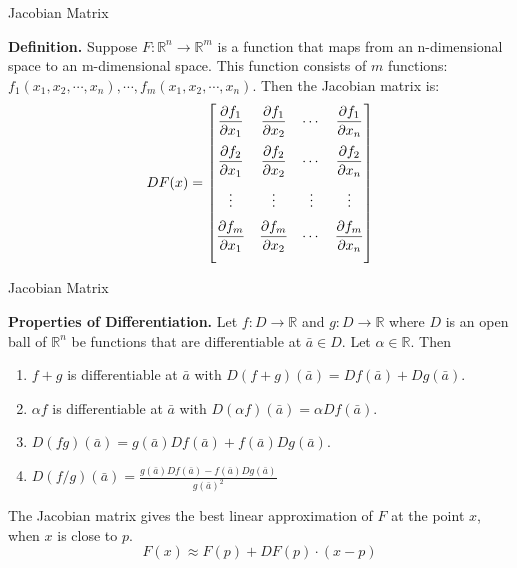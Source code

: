 \documentclass{beamer}
\begin{document}
    \begin{frame}[t]{Jacobian Matrix}
        \begin{block}
            \par \textbf{Definition.} Suppose $F:\mathbb{R}^n\rightarrow\mathbb{R}^m$ is a function that maps from an n-dimensional space to an m-dimensional space. This function consists of $m$ functions: $f_1(x_1,x_2,\cdots, x_n),\cdots,f_m(x_1,x_2,\cdots, x_n)$. Then the Jacobian matrix is:
        \begin{equation*}
DF(x) = 
	\begin{bmatrix}
		\vspace{1.5ex}
		\dfrac{\partial f_1}{\partial x_1} & \dfrac{\partial f_1}{\partial x_2}  & \cdots & \dfrac{\partial f_1}{\partial x_n}\\ 
		\vspace{1.5ex}
		\dfrac{\partial f_2}{\partial x_1} & \dfrac{\partial f_2}{\partial x_2}  & \cdots & \dfrac{\partial f_2}{\partial x_n}\\
		\vspace{1.5ex}
		\vdots                             & \vdots                              & \vdots & \vdots                            \\
		\vspace{1.5ex}
		\dfrac{\partial f_m}{\partial x_1} & \dfrac{\partial f_m}{\partial x_2}  & \cdots & \dfrac{\partial f_m}{\partial x_n}
	\end{bmatrix}
\end{equation*}

        \end{block}

    \end{frame}

    \begin{frame}{Jacobian Matrix}
        \begin{block}
            \par \textbf{Properties of Differentiation.} Let $f: D \to \mathbb{R}$ and $g: D \to \mathbb{R}$ where $D$ is an open ball of $\mathbb{R}^n$ be functions that are differentiable at $\bar{a} \in D$. Let $\alpha \in \mathbb{R}$. Then 
            \begin{enumerate}
                \item $f + g$ is differentiable at $\bar{a}$ with $D(f+g) (\bar{a}) = Df(\bar{a}) + Dg (\bar{a})$.
                \item $\alpha f$ is differentiable at $\bar{a}$ with $D(\alpha f) (\bar{a}) = \alpha D f(\bar{a})$.
                \item $D(fg) (\bar{a}) = g (\bar{a})Df(\bar{a}) + f(\bar{a})Dg (\bar{a})$.
                \item $D(f/g) (\bar{a}) = \frac{g (\bar{a})Df(\bar{a}) - f(\bar{a})Dg (\bar{a})}{g (\bar{a})^2}$
            \end{enumerate}
        \end{block}

        \par The Jacobian matrix gives the best linear approximation of $F$ at the point $x$, when $x$ is close to $p$.
        $$F(x) \approx F(p) + DF(p)\cdot (x-p)$$
    \end{frame}
    
\end{document}
